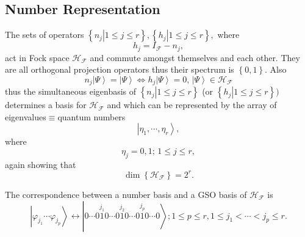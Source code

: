 \documentclass[aps,preprint]{revtex4}%
\begin{document}
\subsection{Number Representation}

The sets of operators $\left\{  \left.  n_{j}\right\vert 1\leq j\leq
r\right\}  ,\left\{  \left.  h_{j}\right\vert 1\leq j\leq r\right\}  ,$ where
\begin{equation}
h_{j}=I_{\mathcal{F}}-n_{j},
\end{equation}
act in Fock space $\mathcal{H}_{\mathcal{F}}$ and commute amongst themselves
and each other. They are all orthogonal projection operators thus their
spectrum is $\left\{  0,1\right\}  .$ Also
\begin{equation}
n_{j}\left\vert \Psi\right\rangle =\left\vert \Psi\right\rangle
\Leftrightarrow h_{j}\left\vert \Psi\right\rangle =0,\,\left\vert
\Psi\right\rangle \in\mathcal{H}_{\mathcal{F}}%
\end{equation}
thus the simultaneous eigenbasis of $\left\{  \left.  n_{j}\right\vert 1\leq
j\leq r\right\}  $ (or $\left\{  \left.  h_{j}\right\vert 1\leq j\leq
r\right\}  )$ determines a basis for $\mathcal{H}_{\mathcal{F}}$ and which can
be represented by the array of eigenvalues$\equiv$quantum numbers
\begin{equation}
\left\vert \eta_{1},\cdots,\eta_{r}\right\rangle ,
\end{equation}
where
\begin{equation}
\eta_{j}=0,1;\,1\leq j\leq r,
\end{equation}
again showing that
\begin{equation}
\dim\left\{  \mathcal{H}_{\mathcal{F}}\right\}  =2^{r}.
\end{equation}


The correspondence between a number basis and a GSO basis of $\mathcal{H}%
_{\mathcal{F}}$ is
\begin{equation}
\left\vert \varphi_{j_{1}}\cdots\varphi_{j_{p}}\right\rangle
\longleftrightarrow\left\vert 0\cdots0\overset{j_{1}}{1}0\cdots0\overset{j_{2}%
}{1}0\cdots0\overset{j_{p}}{1}0\cdots0\right\rangle ;1\leq p\leq r,1\leq
j_{1}<\cdots<j_{p}\leq r.
\end{equation}
\end{document}
